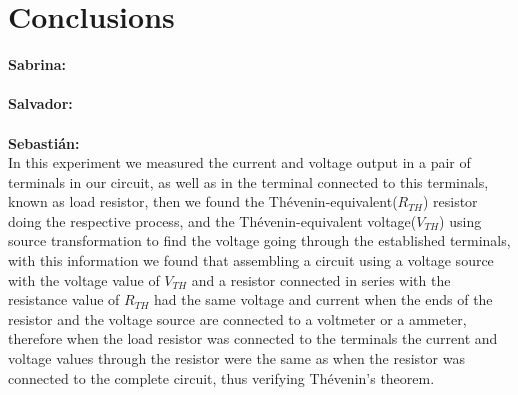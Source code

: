 \documentclass[letterpaper]{article}
\begin{document}
\section{Conclusions}
{\large\textbf{Sabrina:}}\\
%
\\[2ex]
{\large\textbf{Salvador:}}\\
%
\\[2ex]
{\large\textbf{Sebastián:}}\\
In this experiment we measured the current and voltage output in a pair of terminals in our
circuit, as well as in the terminal connected to this terminals, known as load resistor, then we found the Thévenin-equivalent($R_{TH}$) resistor doing the respective process, and the
Thévenin-equivalent voltage($V_{TH}$) using source transformation to find the voltage going through the
established terminals, with this information we found that assembling a circuit using a voltage
source with the voltage value of $V_{TH}$ and a resistor connected in series with the resistance
value of $R_{TH}$ had the same voltage and current when the ends of the resistor and the voltage
source are connected to a voltmeter or a ammeter, therefore when the load resistor was connected
to the terminals the current and voltage values through the resistor were the same as when the
resistor was connected to the complete circuit, thus verifying Thévenin's theorem.
\end{document}
